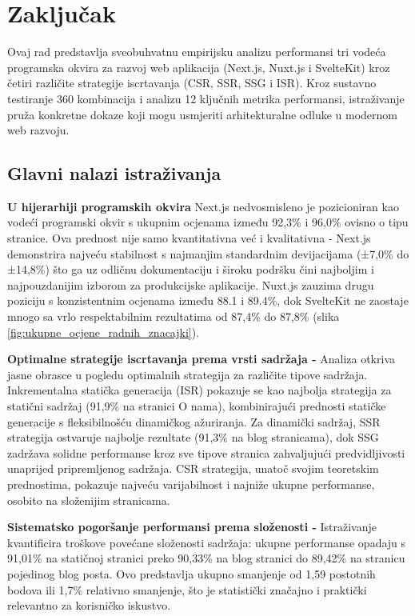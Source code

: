 \section{Zaključak}

Ovaj rad predstavlja sveobuhvatnu empirijsku analizu performansi tri vodeća programska okvira za razvoj web aplikacija (Next.js, Nuxt.js i SvelteKit) kroz četiri različite strategije iscrtavanja (CSR, SSR, SSG i ISR). Kroz sustavno testiranje 360 kombinacija i analizu 12 ključnih metrika performansi, istraživanje pruža konkretne dokaze koji mogu usmjeriti arhitekturalne odluke u modernom web razvoju.

\subsection{Glavni nalazi istraživanja}

\textbf{U hijerarhiji programskih okvira} Next.js nedvosmisleno je pozicioniran kao vodeći programski okvir s ukupnim ocjenama između 92,3\% i 96,0\% ovisno o tipu stranice. Ova prednost nije samo kvantitativna već i kvalitativna - Next.js demonstrira najveću stabilnost s najmanjim standardnim devijacijama (±7,0\% do ±14,8\%) što ga uz odličnu dokumentaciju i široku podršku čini najboljim i najpouzdanijim izborom za produkcijske aplikacije. Nuxt.js zauzima drugu poziciju s konzistentnim ocjenama između 88.1 i 89.4\%, dok SvelteKit ne zaostaje mnogo sa vrlo respektabilnim rezultatima od 87,4\% do 87,8\% (slika \ref{fig:ukupne_ocjene_radnih_znacajki}).

\textbf{Optimalne strategije iscrtavanja prema vrsti sadržaja -} Analiza otkriva jasne obrasce u pogledu optimalnih strategija za različite tipove sadržaja. Inkrementalna statička generacija (ISR) pokazuje se kao najbolja strategija za statični sadržaj (91,9\% na stranici O nama), kombinirajući prednosti statičke generacije s fleksibilnošću dinamičkog ažuriranja. Za dinamički sadržaj, SSR strategija ostvaruje najbolje rezultate (91,3\% na blog stranicama), dok SSG zadržava solidne performanse kroz sve tipove stranica zahvaljujući predvidljivosti unaprijed pripremljenog sadržaja. CSR strategija, unatoč svojim teoretskim prednostima, pokazuje najveću varijabilnost i najniže ukupne performanse, osobito na složenijim stranicama.

\textbf{Sistematsko pogoršanje performansi prema složenosti -} Istraživanje kvantificira troškove povećane složenosti sadržaja: ukupne performanse opadaju s 91,01\% na statičnoj stranici preko 90,33\% na blog stranici do 89,42\% na stranicu pojedinog blog posta. Ovo predstavlja ukupno smanjenje od 1,59 postotnih bodova ili 1,7\% relativno smanjenje, što je statistički značajno i praktički relevantno za korisničko iskustvo.

